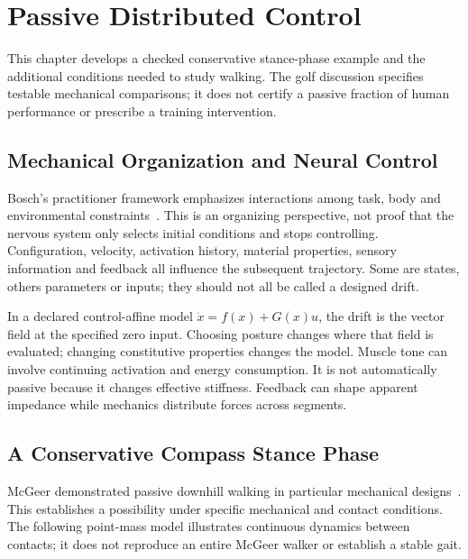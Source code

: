 \chapter{Passive Distributed Control}
\label{ch:passive-control}

\begin{gomdraftnotice}
This chapter develops a checked conservative stance-phase example and the
additional conditions needed to study walking. The golf discussion specifies
testable mechanical comparisons; it does not certify a passive fraction of
human performance or prescribe a training intervention.
\end{gomdraftnotice}

\section{Mechanical Organization and Neural Control}

Bosch's practitioner framework emphasizes interactions among task, body and
environmental constraints~\cite{Bosch2015}. This is an organizing perspective,
not proof that the nervous system only selects initial conditions and stops
controlling. Configuration, velocity, activation history, material properties,
sensory information and feedback all influence the subsequent trajectory.
Some are states, others parameters or inputs; they should not all be called
a designed drift.

In a declared control-affine model $\dot x=f(x)+G(x)u$, the drift is the vector
field at the specified zero input. Choosing posture changes where that field
is evaluated; changing constitutive properties changes the model. Muscle tone
can involve continuing activation and energy consumption. It is not
automatically passive because it changes effective stiffness. Feedback can
shape apparent impedance while mechanics distribute forces across segments.

\section{A Conservative Compass Stance Phase}

McGeer demonstrated passive downhill walking in particular mechanical
designs~\cite{McGeer1990}. This establishes a possibility under specific
mechanical and contact conditions. The following point-mass model illustrates
continuous dynamics between contacts; it does not reproduce an entire McGeer
walker or establish a stable gait.

